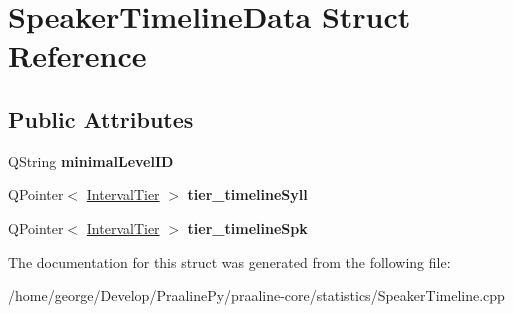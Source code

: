 \hypertarget{struct_speaker_timeline_data}{}\section{Speaker\+Timeline\+Data Struct Reference}
\label{struct_speaker_timeline_data}
\subsection*{Public Attributes}
\begin{DoxyCompactItemize}
\item 
\mbox{\label{struct_speaker_timeline_data_adc099c3a0780b2ba32a543fdbe6f699f}} 
Q\+String {\bfseries minimal\+Level\+ID}
\item 
\mbox{\label{struct_speaker_timeline_data_ac317d58176432789578eaad5022b27fb}} 
Q\+Pointer$<$ \hyperlink{class_interval_tier}{Interval\+Tier} $>$ {\bfseries tier\+\_\+timeline\+Syll}
\item 
\mbox{\label{struct_speaker_timeline_data_afc3e9a59c743d6bbae75a09d3d6a5e1a}} 
Q\+Pointer$<$ \hyperlink{class_interval_tier}{Interval\+Tier} $>$ {\bfseries tier\+\_\+timeline\+Spk}
\end{DoxyCompactItemize}


The documentation for this struct was generated from the following file\+:\begin{DoxyCompactItemize}
\item 
/home/george/\+Develop/\+Praaline\+Py/praaline-\/core/statistics/Speaker\+Timeline.\+cpp\end{DoxyCompactItemize}
